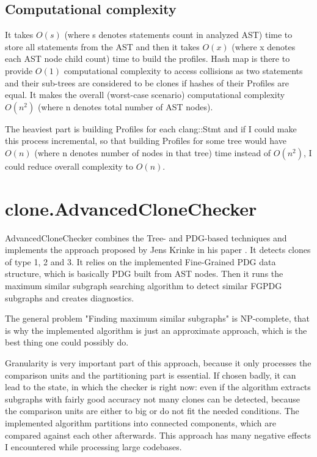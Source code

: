 \documentclass[a0,portrait]{a0poster}
\begin{document}
\begin{multicols}{2}
\subsection*{Computational complexity}

It takes $O(s)$ (where s denotes statements count in analyzed AST) time to store all statements 
from the AST and then it takes $O(x)$ (where x denotes each AST node child count) time to build the 
profiles. Hash map is there to provide $O(1)$ computational complexity to access collisions as
two statements and their sub-trees are considered to be clones if hashes of their Profiles are 
equal. It makes the overall (worst-case scenario) computational complexity $O(n^2)$ (where n 
denotes total number of AST nodes).

The heaviest part is building Profiles for each clang::Stmt and if I could make this process 
incremental, so that building Profiles for some tree would have $O(n)$ (where n denotes number of 
nodes in that tree) time instead of $O(n^2)$, I could reduce overall complexity to $O(n)$.


\section*{clone.AdvancedCloneChecker}

AdvancedCloneChecker combines the Tree- and PDG-based techniques and implements the approach
proposed by Jens Krinke in his paper \cite{FineGrainedPDG}. It detects clones of type 1, 2 and 3. 
It relies on the implemented Fine-Grained PDG data structure, which is basically PDG built from AST 
nodes. Then it runs the maximum similar subgraph searching algorithm to detect similar FGPDG 
subgraphs and creates diagnostics.

The general problem "Finding maximum similar subgraphs" is NP-complete, that is why the implemented 
algorithm is just an approximate approach, which is the best thing one could possibly do.

Granularity is very important part of this approach, because it only processes the comparison
units and the partitioning part is essential. If chosen badly, it can lead to the state, in which
the checker is right now: even if the algorithm extracts subgraphs with fairly good accuracy
not many clones can be detected, because the comparison units are either to big or do not fit
the needed conditions. The implemented algorithm partitions into connected components, which are
compared against each other afterwards. This approach has many negative effects I encountered
while processing large codebases.


\end{multicols}
\end{document}
